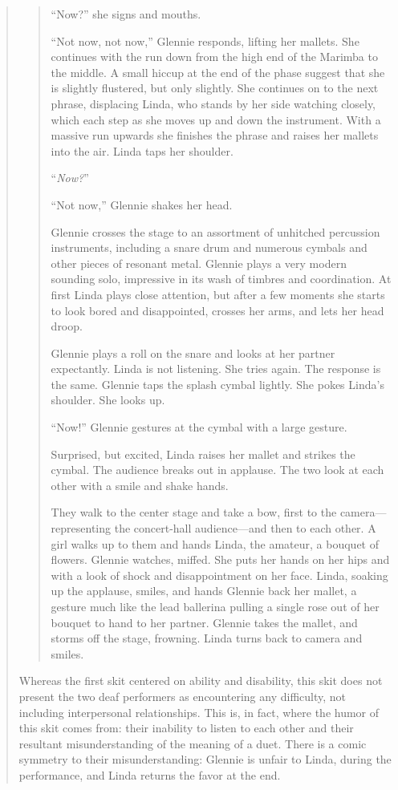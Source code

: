 \documentclass[12pt,letterpaper]{article}
\begin{document}
\begin{quote}
\begin{quote}
	``Now?'' she signs and mouths.

	``Not now, not now,'' Glennie responds, lifting her mallets. She continues
	 with the run down from the high end of the Marimba to the middle. A 
	small hiccup at the end of the phase suggest that she is slightly 
	flustered, but only slightly. She continues on to the next phrase, 
	displacing Linda, who stands by her side watching closely, which each 
	step as she moves up and down the instrument. With a massive run upwards
	she finishes the phrase and raises her mallets into the air. Linda taps 
	her shoulder.

	``\textit{Now?}'' 

	``Not now,'' Glennie shakes her head. 

	Glennie crosses the stage to an assortment of unhitched percussion 
	instruments, including a snare drum and numerous cymbals and other 
	pieces of resonant metal. Glennie plays a very modern sounding solo, 
	impressive in its wash of timbres and coordination. At first Linda 
	plays close attention, but after a few moments she starts to look bored 
	and disappointed, crosses her arms, and lets her head droop.

	Glennie plays a roll on the snare and looks at her partner expectantly. 
	Linda is not listening. She tries again. The response is the same. 
	Glennie taps the splash cymbal lightly. She pokes Linda's shoulder. She 
	looks up.

	``Now!'' Glennie gestures at the cymbal with a large gesture. 

	Surprised, but excited, Linda raises her mallet and strikes the cymbal. 
	The audience breaks out in applause. The two look at each other with a 
	smile and shake hands. 

	They walk to the center stage and take a bow, first to the camera---
	representing the concert-hall audience---and then to each other. A girl 
	walks up to them and hands Linda, the amateur, a bouquet of flowers. 
	Glennie watches, miffed. She puts her hands on her hips and with a look 
	of shock and disappointment on her face. Linda, soaking up the applause, 
	smiles, and hands Glennie back her mallet, a gesture much like the lead 
	ballerina pulling a single rose out of her bouquet to hand to her 
	partner. Glennie takes the mallet, and storms off the stage, frowning. 
	Linda turns back to camera and smiles.   
	
	\end{quote}

	Whereas the first skit centered on ability and disability, this skit 
	does not present the two deaf performers as encountering any difficulty,
	not including interpersonal relationships. This is, in fact, where the
	humor of this skit comes from: their inability to listen to each other
	and their resultant misunderstanding of the meaning of a duet. There is
	a comic symmetry to their misunderstanding: Glennie is unfair to Linda, 
	during the performance, and Linda returns the favor at the end. 


\end{quote}
\end{document}
